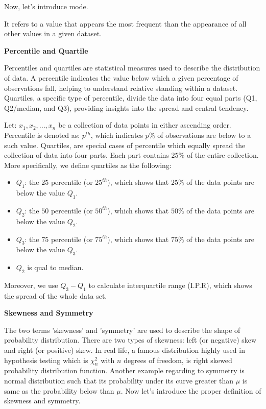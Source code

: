\noindent
Now, let's introduce mode. 

\begin{definition}[Mode]
It refers to a value that appears the most frequent than the appearance of all other values in a given dataset.
\end{definition}

\noindent
\textbf{Percentile and Quartile}

\noindent
Percentiles and quartiles are statistical measures used to describe the distribution of data. A percentile indicates the value below which a given percentage of observations fall, helping to understand relative standing within a dataset. Quartiles, a specific type of percentile, divide the data into four equal parts (Q1, Q2/median, and Q3), providing insights into the spread and central tendency.

\begin{definition}
Let: $x_1, x_2, ..., x_n$ be a collection of data points in either ascending order. Percentile is denoted as: $p^{th}$, which indicates $p \%$ of observations are below to a such value. Quartiles, are special cases of percentile which equally spread the collection of data into four parts. Each part contains $25\%$ of the entire collection. More specifically, we define quartiles as the following:
\begin{itemize}
 \item $Q_1$: the $25$ percentile (or $25^{th}$), which shows that $25\%$ of the data points are below the value $Q_1$.
 \item $Q_2$: the $50$ percentile (or $50^{th}$), which shows that $50\%$ of the data points are below the value $Q_2$.
 \item $Q_3$: the $75$ percentile (or $75^{th}$), which shows that $75\%$ of the data points are below the value $Q_3$.
 \item $Q_2$ is qual to median.
\end{itemize}
Moreover, we use $Q_3 - Q_1$ to calculate interquartile range (I.P.R), which shows the spread of the whole data set.
\end{definition}

\noindent
\textbf{Skewness and Symmetry}

\noindent
The two terms 'skewness' and 'symmetry' are used to describe the shape of probability distribution. There are two types of skewness: left (or negative) skew and right (or positive) skew. In real life, a famous distribution highly used in hypothesis testing which is $\chi_{n}^{2}$ with $n$ degrees of freedom, is right skewed probability distribution function. Another example regarding to symmetry is normal distribution such that its probability under its curve greater than $\mu$ is same as the probability below than $\mu$. Now let's introduce the proper definition of skewness and symmetry.

